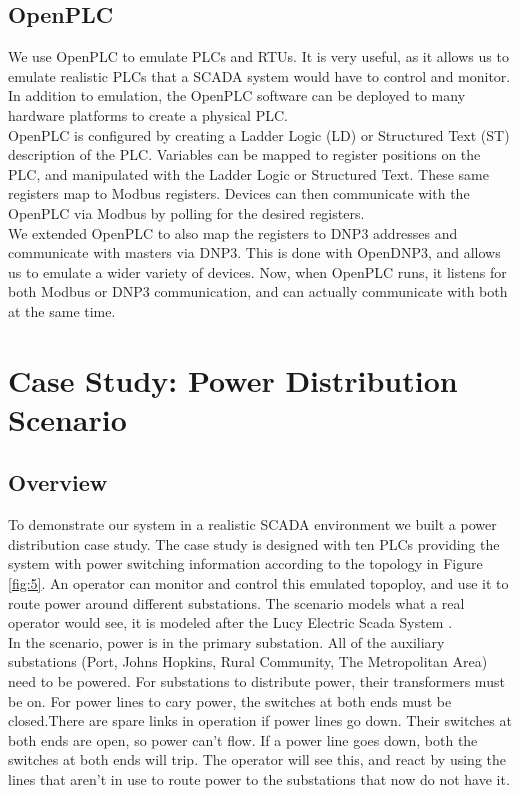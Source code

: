 \documentclass[oneside,11pt,a4paper,oldfontcommands]{book}
\begin{document}
\section{OpenPLC}

\indent \indent 
We use OpenPLC \cite{OpenPLC} to emulate PLCs and RTUs. It is very useful, as
it allows us to emulate realistic PLCs that a SCADA system would have to
control and monitor. In addition to emulation, the OpenPLC software can be deployed to 
many hardware platforms to create a physical PLC. \\

\indent 
OpenPLC is configured by creating a Ladder Logic (LD) or Structured Text (ST) 
description of the PLC. Variables
can be mapped to register positions on the PLC, and manipulated with the
Ladder Logic or Structured Text. These same registers map to Modbus registers. Devices
can then communicate with the OpenPLC via Modbus by polling for the desired registers. \\

\indent
We extended OpenPLC to also map the registers to DNP3 addresses and communicate with 
masters via DNP3. This is done with OpenDNP3, and allows us to emulate a wider variety
of devices. Now, when OpenPLC runs, it listens for both Modbus or DNP3 communication,
and can actually communicate with both at the same time.

\chapter{Case Study: Power Distribution Scenario}

\section{Overview}

\indent \indent
To demonstrate our system in a realistic SCADA environment we built a power distribution
case study. The case study is designed with ten PLCs providing the system with power switching
information according to the topology in Figure \ref{fig:5}. An operator can monitor and control
this emulated topoploy, and use it to route power around different
substations. The scenario models what a real operator would see, it is modeled after
the Lucy Electric Scada System \cite{lucy}. \\

\indent
In the scenario, power is in the
primary substation. All of the auxiliary  substations (Port, Johns Hopkins,
Rural Community, The Metropolitan Area) need to be powered. For substations
to distribute power, their transformers must be on. For power lines to cary
power, the switches at both ends must be closed.There are spare
links in operation if power lines go down. Their switches at both ends are open,
so power can't flow. If a power line goes down, both the switches at both ends
will trip.  The operator will see this, and react by using the lines that aren't
in use to route power to the substations that now do not have it. \\
\end{document}
